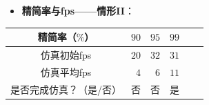 \begin{frame}
\begin{itemize}
  \item \textbf{精简率与fps——情形II}：
\end{itemize}
\begin{table}[t]
\renewcommand{\arraystretch}{0.5}
\centering
\begin{tabular*}{80mm}{c r r r r r}
\toprule
\hspace{5mm} \small{精简率（$\%$）}           & \small{$90$} & \small{$95$} & \small{$99$} \\
\midrule
\hspace{5mm} \small{仿真初始fps}              & \small{$20$} & \small{$32$} & \small{$31$} \\
\midrule
\hspace{5mm} \small{仿真平均fps}              &  \small{$4$} &  \small{$6$} & \small{$11$} \\
\midrule
\hspace{5mm} \small{是否完成仿真？（是/否）}  &  \small{否}  &  \small{否}  & \small{是}   \\
\bottomrule
\end{tabular*}
\end{table}
\end{frame}


